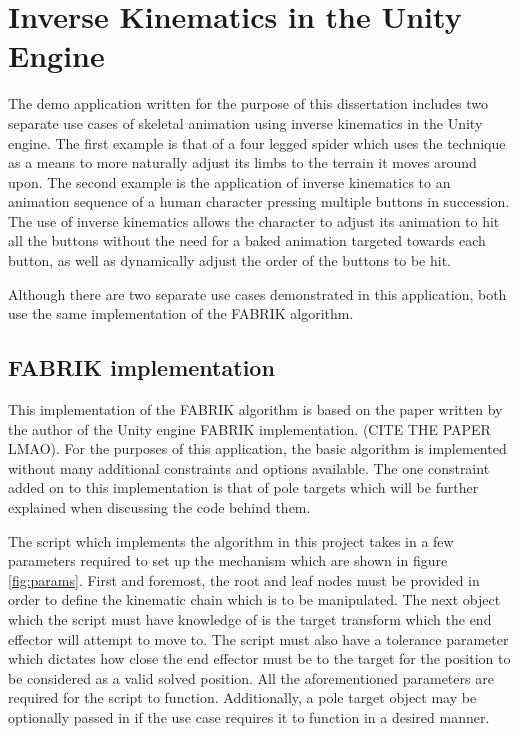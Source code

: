 \chapter{Inverse Kinematics in the Unity Engine} 
The demo application written for the purpose of this dissertation includes two
separate use cases of skeletal animation using inverse kinematics in the Unity
engine. The first example is that of a four legged spider which uses the
technique as a means to more naturally adjust its limbs to the terrain it moves
around upon. The second example is the application of inverse kinematics to an
animation sequence of a human character pressing multiple buttons in succession.
The use of inverse kinematics allows the character to adjust its animation to hit
all the buttons without the need for a baked animation targeted towards each
button, as well as dynamically adjust the order of the buttons to be hit.

Although there are two separate use cases demonstrated in this application, both
use the same implementation of the FABRIK algorithm. 


\section{FABRIK implementation}
This implementation of the FABRIK algorithm is based on the paper written by the
author of the Unity engine FABRIK implementation. (CITE THE PAPER LMAO). For the
purposes of this application, the basic algorithm is implemented without many
additional constraints and options available. The one constraint added on to
this implementation is that of pole targets which will be further explained when
discussing the code behind them.

The script which implements the algorithm in this project takes in a few
parameters required to set up the mechanism which are shown in figure
\ref{fig:params}. First and foremost, the root and leaf nodes must be provided
in order to define the kinematic chain which is to be manipulated. The next
object which the script must have knowledge of is the target transform which the
end effector will attempt to move to. The script must also have a tolerance
parameter which dictates how close the end effector must be to the target for
the position to be considered as a valid solved position. All the aforementioned
parameters are required for the script to function. Additionally, a pole target
object may be optionally passed in if the use case requires it to function in
a desired manner. 

